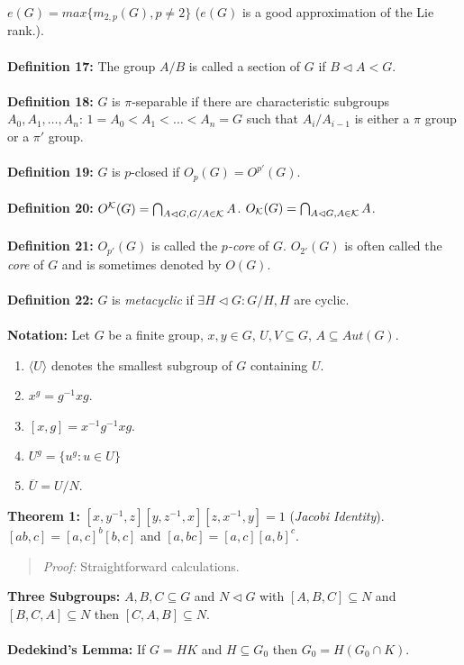 $e(G) = max \{ m_{2,p} (G), p \ne 2 \}$ ($e(G)$ is a good approximation of
the Lie rank.).
\\
\\
{\bf Definition 17:} The group $A/B$ is called a section of $G$ if $B \lhd A <G$.
\\
\\
{\bf Definition 18:} $G$ is $\pi$-separable if there are characteristic subgroups
$A_0, A_1, \ldots , A_n$: $1=A_0<A_1<\ldots<A_n=G$ such that $A_i/A_{i-1}$ is
either a $\pi$ group or a $\pi'$ group.
\\
\\
{\bf Definition 19:} $G$ is $p$-closed if $O_p(G)= O^{p'}(G)$.
\\
\\
{\bf Definition 20:}
$O^{\cal K}(G)= \bigcap_{A \lhd G, G/A \in {\cal K}} A$.
$O_{\cal K}(G)= \bigcap_{A \lhd G, A \in {\cal K}} A$.
\\
\\
{\bf Definition 21:}
$O_{p'}(G)$ is called the $p$\emph{-core} of $G$. $O_{2'}(G)$ is often called the
\emph{core} of $G$ and is sometimes denoted by $O(G)$.
\\
\\
{\bf Definition 22:}
$G$ is
\emph{metacyclic} if $\exists H \lhd G: G/H ,H$ are cyclic.
\\
\\
{\bf Notation:}  Let $G$ be a finite group, $x, y \in G$, $U, V \subseteq G$,
$A \subseteq Aut(G)$.
\begin{enumerate}
\item $ \langle U \rangle $ denotes the smallest subgroup of $G$ containing $U$.
\item $x^g= g^{-1}xg$.
\item $[x,g]= x^{-1} g^{-1} x g$.
\item $U^g= \{ u^g: u \in U \}$
\item ${\overline U} = U/N$.
\end{enumerate}
{\bf Theorem 1:}
$ [x, y^{-1}, z] [y, z^{-1}, x] [z, x^{-1}, y]=1$
(\emph{Jacobi Identity}).
$[ab,c]= [a,c]^b [b,c]$ and $[a,bc]=[a,c] [a,b]^c$.
\begin{quote}
\emph{Proof:} Straightforward calculations.
\end{quote}
{\bf Three Subgroups:} $A, B, C \subseteq G$ and
$N \lhd G$ with
$[A,B,C] \subseteq N$ and
$[B,C,A] \subseteq N$ then
$[C,A,B] \subseteq N$.
\\
\\
{\bf Dedekind's Lemma:}  If $G=HK$ and $H \subseteq G_0$ then $G_0 = H(G_0 \cap K)$.
